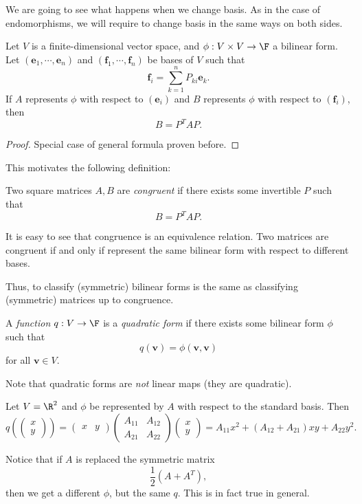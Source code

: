 \documentclass[a4paper]{article}
\begin{document}
We are going to see what happens when we change basis. As in the case of endomorphisms, we will require to change basis in the same ways on both sides.

\begin{lemma}
  Let $V$ is a finite-dimensional vector space, and $\phi: V\times V \to \F$ a bilinear form. Let $(\mathbf{e}_1, \cdots, \mathbf{e}_n)$ and $(\mathbf{f}_1, \cdots, \mathbf{f}_n)$ be bases of $V$ such that
  \[
    \mathbf{f}_i = \sum_{k = 1}^n P_{ki} \mathbf{e}_k.
  \]
  If $A$ represents $\phi$ with respect to $(\mathbf{e}_i)$ and $B$ represents $\phi$ with respect to $(\mathbf{f}_i)$, then
  \[
    B = P^T AP.
  \]
\end{lemma}

\begin{proof}
  Special case of general formula proven before.
\end{proof}

This motivates the following definition:
\begin{defi}
  Two square matrices $A, B$ are \emph{congruent} if there exists some invertible $P$ such that
  \[
    B = P^T AP.
  \]
\end{defi}
It is easy to see that congruence is an equivalence relation. Two matrices are congruent if and only if represent the same bilinear form with respect to different bases.

Thus, to classify (symmetric) bilinear forms is the same as classifying (symmetric) matrices up to congruence.

\begin{defi}
  A \emph{function} $q: V \to \F$ is a \emph{quadratic form} if there exists some bilinear form $\phi$ such that
  \[
    q(\mathbf{v}) = \phi(\mathbf{v}, \mathbf{v})
  \]
  for all $\mathbf{v} \in V$.
\end{defi}
Note that quadratic forms are \emph{not} linear maps (they are quadratic).

\begin{eg}
  Let $V = \R^2$ and $\phi$ be represented by $A$ with respect to the standard basis. Then
  \[
    q\left(
    \begin{pmatrix}
      x\\y
    \end{pmatrix}\right) =
    \begin{pmatrix}
      x & y
    \end{pmatrix}
    \begin{pmatrix}
      A_{11} & A_{12}\\
      A_{21} & A_{22}
    \end{pmatrix}
    \begin{pmatrix}
      x\\y
    \end{pmatrix}
    = A_{11} x^2 + (A_{12} + A_{21}) xy + A_{22}y^2.
  \]
\end{eg}
Notice that if $A$ is replaced the symmetric matrix
\[
  \frac{1}{2}(A + A^T),
\]
then we get a different $\phi$, but the same $q$. This is in fact true in general.
\end{document}
